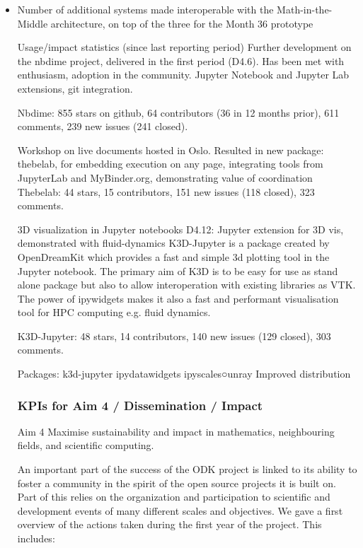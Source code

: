 \begin{Aim 1}
\begin{Aim 2}
\begin{itemize}
\item Number of additional systems made interoperable with the Math-in-the-Middle architecture, on top of the three for the Month
  36 prototype



Usage/impact statistics (since last reporting period)
Further development on the nbdime project, delivered in the first period (D4.6). Has been met with enthusiasm, adoption in the community.
Jupyter Notebook and Jupyter Lab extensions, git integration.

Nbdime: 855 stars on github, 64 contributors (36 in 12 months prior), 611 
comments, 239 new issues (241 closed).

Workshop on live documents hosted in Oslo. Resulted in new package: thebelab, for embedding execution on any page, integrating tools from 
JupyterLab and MyBinder.org, demonstrating value of coordination
Thebelab: 44 stars, 15 contributors, 151 new issues (118 closed), 323 
comments.

3D visualization in Jupyter notebooks D4.12: Jupyter extension for 3D vis, demonstrated with fluid-dynamics
K3D-Jupyter is a package created by OpenDreamKit which provides a fast and simple 3d plotting tool in the Jupyter notebook. The primary aim 
of K3D is to be easy for use as stand alone package but also to allow interoperation with existing libraries as VTK. The power of ipywidgets 
makes it also a fast and performant visualisation tool for HPC computing e.g. fluid dynamics.

K3D-Jupyter: 48 stars, 14 contributors, 140 new issues (129 closed), 303 
comments.

Packages:
k3d-jupyter
ipydatawidgets
ipyscales○unray
Improved distribution

\subsubsection{KPIs for Aim 4 / Dissemination / Impact}

\begin{recommendation}{Aim 4}
  Maximise sustainability and impact in mathematics, neighbouring fields, and scientific computing.\end{recommendation}


An important part of the success of the ODK project is linked to its ability to foster a community in the spirit of the open source projects it is built on. Part of this relies on the organization and participation to scientific and development events of many different scales and objectives. We gave a first overview of the actions taken during the first year of the project. This includes:


\end{itemize}
\end{Aim 2}
\end{Aim 1}
